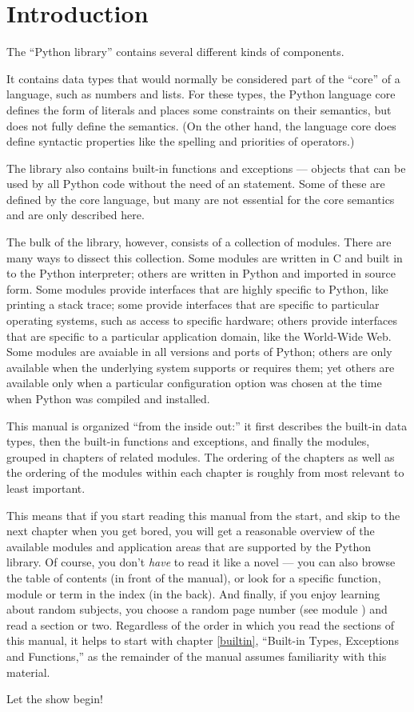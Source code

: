 \chapter{Introduction}
\label{intro}

The ``Python library'' contains several different kinds of components.

It contains data types that would normally be considered part of the
``core'' of a language, such as numbers and lists.  For these types,
the Python language core defines the form of literals and places some
constraints on their semantics, but does not fully define the
semantics.  (On the other hand, the language core does define
syntactic properties like the spelling and priorities of operators.)

The library also contains built-in functions and exceptions ---
objects that can be used by all Python code without the need of an
 statement.  Some of these are defined by the core
language, but many are not essential for the core semantics and are
only described here.

The bulk of the library, however, consists of a collection of modules.
There are many ways to dissect this collection.  Some modules are
written in C and built in to the Python interpreter; others are
written in Python and imported in source form.  Some modules provide
interfaces that are highly specific to Python, like printing a stack
trace; some provide interfaces that are specific to particular
operating systems, such as access to specific hardware; others provide
interfaces that are
specific to a particular application domain, like the World-Wide Web.
Some modules are avaiable in all versions and ports of Python; others
are only available when the underlying system supports or requires
them; yet others are available only when a particular configuration
option was chosen at the time when Python was compiled and installed.

This manual is organized ``from the inside out:'' it first describes
the built-in data types, then the built-in functions and exceptions,
and finally the modules, grouped in chapters of related modules.  The
ordering of the chapters as well as the ordering of the modules within
each chapter is roughly from most relevant to least important.

This means that if you start reading this manual from the start, and
skip to the next chapter when you get bored, you will get a reasonable
overview of the available modules and application areas that are
supported by the Python library.  Of course, you don't \emph{have} to
read it like a novel --- you can also browse the table of contents (in
front of the manual), or look for a specific function, module or term
in the index (in the back).  And finally, if you enjoy learning about
random subjects, you choose a random page number (see module
) and read a section or two.  Regardless of the
order in which you read the sections of this manual, it helps to start 
with chapter \ref{builtin}, ``Built-in Types, Exceptions and
Functions,'' as the remainder of the manual assumes familiarity with
this material.

Let the show begin!
